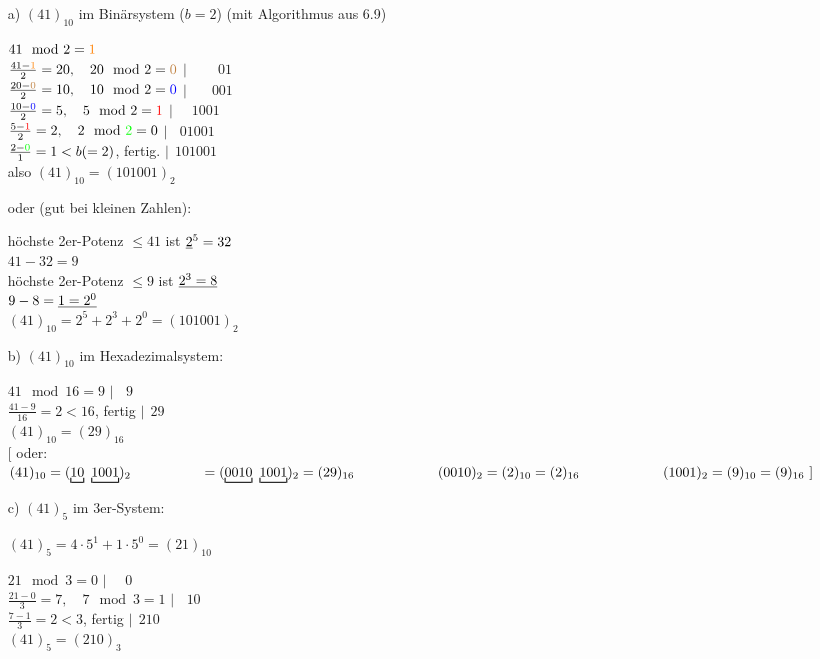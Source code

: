 \documentclass[a4paper, 12pt, twoside] {article}
\begin{document}
\begin{itemize}
\item[a)] $(41)_{10}$ im Binärsystem ($b=2$) (mit Algorithmus aus 6.9)

$41 \mod 2 = \textcolor{orange}{1}$ \\
$\frac{41-\textcolor{orange}{1}}{2} = 20, \quad 20 \mod 2 = \textcolor{brown}{0}$ \hfill $|\,\;\,\;\,\;\,\;\,\;01$ \\
$\frac{20-\textcolor{brown}{0}}{2}=10, \quad 10 \mod 2 = \textcolor{blue}{0}$ \hfill $|\,\;\,\;\,\;\,\;001$ \\
$\frac{10-\textcolor{blue}{0}}{2}=5, \quad 5 \mod 2 = \textcolor{red}{1}$ \hfill $|\,\;\,\;\,\;1001$ \\
$\frac{5-\textcolor{red}{1}}{2}=2, \quad 2 \mod \textcolor{green}{2} = 0$ \hfill $|\,\;\,\;01001$ \\
$\frac{2-\textcolor{green}{0}}{1}=1 < b (=2)$, fertig. \hfill $|\,\;101001$ \\
also $(41)_{10} = (101001)_2$

oder (gut bei kleinen Zahlen):

höchste 2er-Potenz $\leq 41$ ist $\uline{2}^5=32$ \\
$41-32 = 9$ \\
höchste 2er-Potenz $\leq 9$ ist $\uline{2^3=8}$ \\
$9-8 = \uline{1 = 2^0}$ \\
$(41)_{10} = 2^5+2^3+2^0 = (101001)_2$

\item[b)] $(41)_{10}$ im Hexadezimalsystem:

$41 \mod 16 = 9$ \hfill $|\,\;\,\;9$ \\
$\frac{41-9}{16} = 2 < 16$, fertig \hfill $|\,\;29$ \\

$(41)_{10} = (29)_{16}$ \\
$[$ oder: $(41)_{10} = (\underbracket[0.75pt]{10}\ \underbracket[0.75pt]{1001})_2 \\
\text{\qquad \qquad \quad} = (\underbracket[0.75pt]{0010}\ \underbracket[0.75pt]{1001})_2 = (29)_{16}\ \\ \\
\text{\qquad \qquad \qquad} (0010)_2 = (2)_{10} = (2)_{16} \\
\text{\qquad \qquad \qquad} (1001)_2 = (9)_{10} = (9)_{16} \ ]$

\item[c)] $(41)_5$ im 3er-System: 

$(41)_5 = 4 \cdot 5^1 + 1 \cdot 5^0 = (21)_{10}$

$21 \mod 3 = 0$ \hfill $|\,\;\,\;\,\;0$ \\
$\frac{21-0}{3}=7, \quad 7 \mod 3 = 1$ \hfill $|\,\;\,\;10$ \\
$\frac{7-1}{3}=2 < 3$, fertig \hfill $|\,\;210$ \\
$(41)_5 = (210)_3$

\end{itemize}
\end{document}

